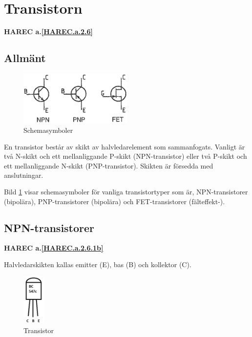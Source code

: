 \section{Transistorn}
\textbf{HAREC a.\ref{HAREC.a.2.6}\label{myHAREC.a.2.6}}
\label{transistorn}

\subsection{Allmänt}

\begin{figure}
\includegraphics[width=0.5\textwidth]{images/cropped_pdfs/bild_2_2-16.pdf}
\caption{Schemasymboler}
\label{fig:BildII2-16}
\end{figure}

En transistor består av skikt av halvledarelement som sammanfogats.
Vanligt är två N-skikt och ett mellanliggande P-skikt (NPN-transistor) eller
två P-skikt och ett mellanliggande N-skikt (PNP-transistor).
Skikten är försedda med anslutningar.

Bild \ref{fig:BildII2-16} visar schemasymboler för vanliga transistortyper som
är, NPN-transistorer (bipolära), PNP-transistorer (bipolära) och
FET-transistorer (fälteffekt-).

\subsection{NPN-transistorer}
\textbf{HAREC a.\ref{HAREC.a.2.6.1b}\label{myHAREC.a.2.6.1b}}

Halvledarskikten kallas emitter (E), bas (B) och kollektor (C).

\begin{figure}
\begin{center}
\includegraphics[width=0.1\textwidth]{images/cropped_pdfs/bild_2_6-37.pdf}
\end{center}
\caption{Transistor}
\label{fig:BildII2-17a}
\end{figure}

